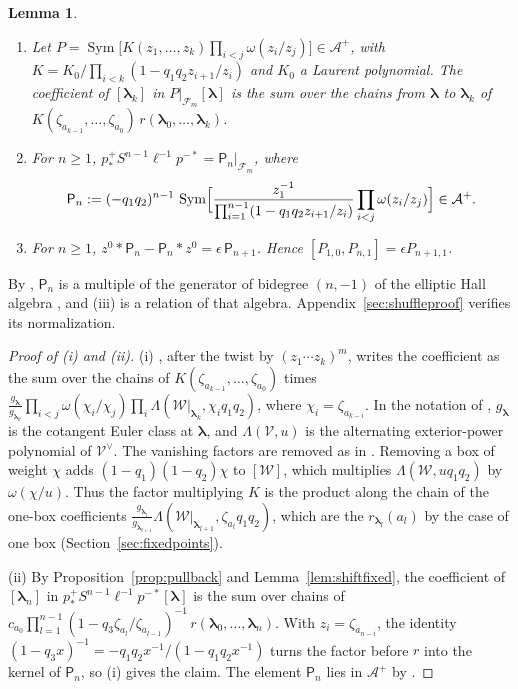 \documentclass[11pt]{amsart}
\newtheorem{lemma}[theorem]{Lemma}
\theoremstyle{definition}
\theoremstyle{remark}
\newcommand{\bl}{{\boldsymbol{\lambda}}}         %
\newcommand{\bwt}[1]{\zeta_{#1}}                 %
\newcommand{\res}[2]{r_{#1}(#2)}                 %
\newcommand{\ceig}[1]{c_{#1}}                    %
\newcommand{\Fock}[1]{\mathcal F_{#1}}            %
\newcommand{\Wc}{\mathcal W}                     %
\newcommand{\fix}[1]{[#1]}                       %
\newcommand{\taut}{\ell}                         %
\newcommand{\pulm}{p^{-*}}                       %
\newcommand{\pushp}{p^+_*}                       %
\newcommand{\Shift}{S}                           %
\newcommand{\Shuf}{\mathcal A^{+}}               %
\DeclareMathOperator{\Sym}{Sym}
\begin{document}
\begin{lemma}\label{lem:shuffle}
\begin{enumerate}
\item[(i)] Let \(P=\Sym\bigl[K(z_1,\dots,z_k)\prod_{i<j}\omega(z_i/z_j)\bigr]\in\Shuf\),
with \(K=K_0/\prod_{i<k}(1-q_1q_2z_{i+1}/z_i)\) and \(K_0\) a Laurent polynomial. The
coefficient of \(\fix{\bl_k}\) in
\(P|_{\Fock{m}}\fix{\bl}\) is the sum over the chains from \(\bl\) to \(\bl_k\) of
\(K(\bwt{a_{k-1}},\dots,\bwt{a_0})\,r(\bl_0,\dots,\bl_k)\).
\item[(ii)] For \(n\geq1\), \(\pushp\Shift^{n-1}\taut^{-1}\pulm=\mathsf P_n|_{\Fock{m}}\), where
\[
 \mathsf P_n:=(-q_1q_2)^{n-1}\,
 \Sym\Bigl[\frac{z_1^{-1}}{\prod_{i=1}^{n-1}(1-q_1q_2z_{i+1}/z_i)}
 \prod_{i<j}\omega(z_i/z_j)\Bigr]\in\Shuf.
\]
\item[(iii)] For \(n\geq1\), \(z^0*\mathsf P_n-\mathsf P_n*z^0=\epsilon\,\mathsf P_{n+1}\). Hence
\([P_{1,0},P_{n,1}]=\epsilon P_{n+1,1}\).
\end{enumerate}
\end{lemma}

By \cite[(4.18)]{N1}, \(\mathsf P_n\) is a multiple of the generator of bidegree \((n,-1)\) of the
elliptic Hall algebra \cite{Negutshuffle}, and (iii) is a relation of that algebra.
Appendix~\ref{sec:shuffleproof} verifies its normalization.

\begin{proof}[Proof of (i) and (ii)]
(i) \cite[Proposition~5.5]{N1}, after the twist by \((z_1\cdots z_k)^m\), writes the coefficient as
the sum over the chains of \(K(\bwt{a_{k-1}},\dots,\bwt{a_0})\) times
\(\frac{g_{\bl}}{g_{\bl_k}}\prod_{i<j}\omega(\chi_i/\chi_j)\prod_i\Lambda(\Wc|_{\bl_k},\chi_iq_1q_2)\),
where \(\chi_i=\bwt{a_{k-i}}\). In the notation of \cite{N1}, \(g_\bl\) is the
cotangent Euler class at \(\bl\), and \(\Lambda(\mathcal V,u)\) is the
alternating exterior-power polynomial of \(\mathcal V^\vee\).
The vanishing factors are removed as in \cite[Remark~5.6]{N1}. Removing a box of weight
\(\chi\) adds \((1-q_1)(1-q_2)\chi\) to \([\Wc]\), which multiplies
\(\Lambda(\Wc,uq_1q_2)\) by \(\omega(\chi/u)\). Thus the factor multiplying \(K\) is the product along the
chain of the one-box coefficients \(\frac{g_{\bl_l}}{g_{\bl_{l+1}}}
\Lambda(\Wc|_{\bl_{l+1}},\bwt{a_l}q_1q_2)\), which are the
\(\res{\bl_l}{a_l}\) by the case of one box (Section~\ref{sec:fixedpoints}).

(ii) By Proposition~\ref{prop:pullback} and Lemma~\ref{lem:shiftfixed}, the coefficient
of \(\fix{\bl_n}\) in \(\pushp\Shift^{n-1}\taut^{-1}\pulm\fix{\bl}\) is the sum over chains of
\(\ceig{a_0}\prod_{l=1}^{n-1}(1-q_3\bwt{a_l}/\bwt{a_{l-1}})^{-1}\,r(\bl_0,\dots,\bl_n)\).
With \(z_i=\bwt{a_{n-i}}\), the identity
\((1-q_3x)^{-1}=-q_1q_2x^{-1}/(1-q_1q_2x^{-1})\) turns the factor before \(r\) into the kernel of
\(\mathsf P_n\), so (i) gives the claim. The element \(\mathsf P_n\) lies in
\(\Shuf\) by \cite[Section~4.9]{N1}.
\end{proof}
\end{document}
